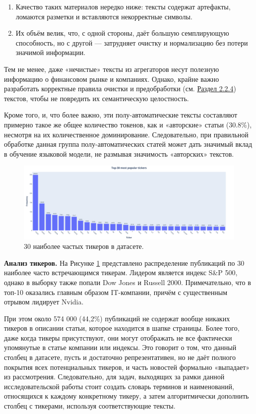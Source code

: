 \begin{enumerate}
    \item Качество таких материалов нередко ниже: тексты содержат артефакты, ломаются разметки и вставляются некорректные символы.
    \item Их объём велик, что, с одной стороны, даёт большую семплирующую способность, но с другой — затрудняет очистку и нормализацию без потери значимой информации.
\end{enumerate}

Тем не менее, даже «нечистые» тексты из агрегаторов несут полезную информацию о финансовом рынке и компаниях. Однако, крайне важно разработать корректные правила
очистки и предобработки (см. \hyperref[sec:data_prep]{Раздел 2.2.4}) текстов, чтобы не повредить их семантическую целостность.

Кроме того, и, что более важно, эти полу-автоматические тексты составляют примерно такое же общее количество токенов,
как и «авторские» статьи (30.8\%), несмотря на их количественное доминирование. Следовательно, при правильной обработке
данная группа полу-автоматических статей может дать значимый вклад в обучение языковой модели, не размывая значимость
«авторских» текстов.

\begin{figure}[H]
    \centering
    \includegraphics[width=1\linewidth]{img/top30_tickers.png}
    \caption{\label{fig:dist_tickers}30 наиболее частых тикеров в датасете.}
\end{figure}

\textbf{Анализ тикеров.} На Рисунке \ref{fig:dist_tickers} представлено распределение публикаций по 30 наиболее часто встречающимся
тикерам. Лидером является индекс S\&P 500, однако в выборку также попали Dow Jones и Russell 2000. Примечательно, что в топ-10
оказались главным образом IT-компании, причём с существенным отрывом лидирует Nvidia.

При этом около 574 000 (44,2\%) публикаций не содержат вообще никаких тикеров в описании статьи, которое находится
в шапке страницы. Более того, даже когда тикеры присутствуют, они могут отображать не все фактически упомянутые
в статье компании или индексы. Это говорит о том, что данный столбец в датасете, пусть и достаточно репрезентативен,
но не даёт полного покрытия всех потенциальных тикеров, и часть новостей формально «выпадает» из рассмотрения.
Следовательно, для задач, выходящих за рамки данной исследовательской работы стоит создать словарь терминов и наименований,
относящихся к каждому конкретному тикеру, а затем алгоритмически дополнить столбец с тикерами, используя соответствующие тексты.

